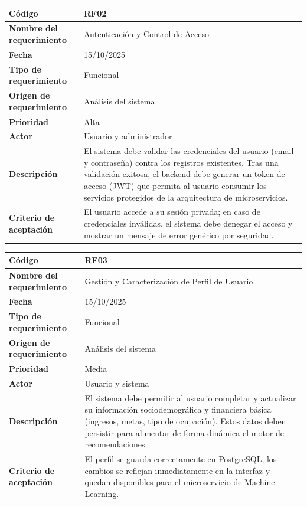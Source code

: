 \begin{table}[H]
	\begin{tabular}{|a{5cm}|m{11cm}|}
		\hline
		\textbf{Código} & RF02 \\ \hline
		\textbf{Nombre del requerimiento} & Autenticación y Control de Acceso \\ \hline
		\textbf{Fecha} & 15/10/2025 \\ \hline
		\textbf{Tipo de requerimiento} & Funcional \\ \hline
		\textbf{Origen de requerimiento} & Análisis del sistema \\ \hline
		\textbf{Prioridad} & Alta \\ \hline
		\textbf{Actor} & Usuario y administrador \\ \hline
		\textbf{Descripción} & El sistema debe validar las credenciales del usuario (email y contraseña) contra los registros existentes. Tras una validación exitosa, el backend debe generar un token de acceso (JWT) que permita al usuario consumir los servicios protegidos de la arquitectura de microservicios. \\ \hline
		\textbf{Criterio de aceptación} & El usuario accede a su sesión privada; en caso de credenciales inválidas, el sistema debe denegar el acceso y mostrar un mensaje de error genérico por seguridad. \\ \hline
	\end{tabular}
\end{table}

\begin{table}[H]
	\begin{tabular}{|a{5cm}|m{11cm}|}
		\hline
		\textbf{Código} & RF03 \\ \hline
		\textbf{Nombre del requerimiento} & Gestión y Caracterización de Perfil de Usuario \\ \hline
		\textbf{Fecha} & 15/10/2025 \\ \hline
		\textbf{Tipo de requerimiento} & Funcional \\ \hline
		\textbf{Origen de requerimiento} & Análisis del sistema \\ \hline
		\textbf{Prioridad} & Media \\ \hline
		\textbf{Actor} & Usuario y sistema \\ \hline
		\textbf{Descripción} & El sistema debe permitir al usuario completar y actualizar su información sociodemográfica y financiera básica (ingresos, metas, tipo de ocupación). Estos datos deben persistir para alimentar de forma dinámica el motor de recomendaciones. \\ \hline
		\textbf{Criterio de aceptación} & El perfil se guarda correctamente en PostgreSQL; los cambios se reflejan inmediatamente en la interfaz y quedan disponibles para el microservicio de Machine Learning. \\ \hline
	\end{tabular}
\end{table}

